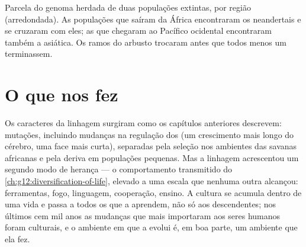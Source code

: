 \begin{omfigure}

{\small Parcela do genoma herdada de duas populações extintas, por
região (arredondada). As populações que saíram da África encontraram os
neandertais e se cruzaram com eles; as que chegaram ao Pacífico
ocidental encontraram também a  asiática. Os ramos do arbusto
trocaram  antes que todos menos um terminassem.}
\end{omfigure}

\section{O que nos fez}

\begin{proposition}\label{prop:g12:human-evolution:culture}
Os caracteres da linhagem surgiram como os capítulos anteriores
descrevem: mutações, incluindo mudanças na regulação dos  (um crescimento mais longo do cérebro, uma face mais
curta), separadas pela seleção nos ambientes das savanas africanas e
pela deriva em populações pequenas. Mas a linhagem acrescentou um
segundo modo de herança --- o comportamento transmitido do
\cref{ch:g12:diversification-of-life}, elevado a uma escala que nenhuma
outra  alcançou: ferramentas, fogo, linguagem, cooperação,
ensino. A cultura se acumula dentro de uma vida e passa a todos os que
a aprendem, não só aos descendentes; nos últimos cem mil anos as
mudanças que mais importaram aos seres humanos foram culturais, e o
ambiente em que a  evolui é, em boa parte, um ambiente que ela fez.
\end{proposition}
\admitted

